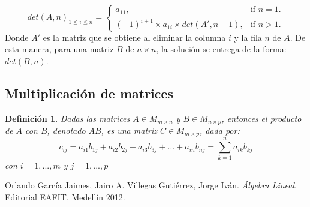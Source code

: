 \documentclass[12pt]{article}
\newtheorem{definition}{Definición}[section]
\begin{document}
	\begin{equation}
	det(A, n)_{1\leq i \leq n}=\begin{cases}
	a_{11}, & \text{if $n = 1$}.\\
	(-1)^{i+1} \times a_{1i} \times det(A', n - 1) , & \text{if $n > 1$}.
	\end{cases}
	\end{equation}
	Donde $A'$ es la matriz que se obtiene al eliminar la columna $i$ y la fila $n$ de $A$. De esta manera, para una matriz $B$ de $n \times n$, la solución se entrega de la forma:
	$det(B, n)$.
	
	\subsection{Multiplicación de matrices}
	\begin{definition}
		Dadas las matrices $A \in M_{m\times n}$ y $B \in M_{n\times p}$, entonces el producto de $A$ con $B$, denotado $AB$, es una matriz $C \in M_{m\times p}$, dada por: \cite{algebralineal}
		\[
			c_{ij} = a_{i1}b_{1j} + a_{i2}b_{2j} + a_{i3}b_{3j} + \dots + a_{in}b_{nj} = \sum_{k = 1}^{n}{a_{ik}b_{kj}}		
		\]
		con $i = 1, ..., m$ y $j = 1, ..., p$
	\end{definition}
	\begin{thebibliography}{9}
		Orlando García Jaimes, Jairo A. Villegas Gutiérrez, Jorge Iván. \textit{Álgebra Lineal}. Editorial EAFIT, Medellín 2012. 
		
	\end{thebibliography}
\end{document}
